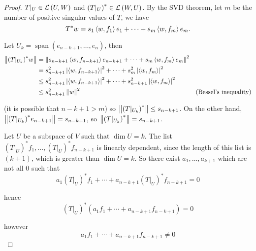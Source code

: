 \begin{proof}
    $T\vert_U\in \mathcal{L}\left({U, W}\right)$ and ${(T\vert_{U})}^{*}\in \mathcal{L}\left({W, U}\right)$. By the SVD theorem, let $m$ be the number of positive singular values of $T$, we have
    \[
        T^{*}w = s_{1}\left\langle{w, f_{1}}\right\rangle e_{1} + \cdots + s_{m}\left\langle{w, f_{m}}\right\rangle e_{m}.
    \]

    Let $U_{k} = \operatorname{span}(e_{n-k+1}, \ldots, e_{n})$, then
    \begin{align*}
        \left\Vert{{(T\vert_{U_{k}})}^{*}w}\right\Vert & = \left\Vert{s_{n-k+1}\left\langle{w, f_{n-k+1}}\right\rangle e_{n-k+1} + \cdots + s_{m}\left\langle{w, f_{m}}\right\rangle e_{m}}\right\Vert^{2}                                          \\
                                       & = s_{n-k+1}^{2}\left\vert{\left\langle{w, f_{n-k+1}}\right\rangle}\right\vert^{2} + \cdots + s_{m}^{2}\left\vert{\left\langle{w, f_{m}}\right\rangle}\right\vert^{2}                                       \\
                                       & \leq s_{n-k+1}^{2}\left\vert{\left\langle{w, f_{n-k+1}}\right\rangle}\right\vert^{2} + \cdots + s_{n-k+1}^{2}\left\vert{\left\langle{w, f_{m}}\right\rangle}\right\vert^{2}                                \\
                                       & \leq s_{n-k+1}^{2}\left\Vert{w}\right\Vert^{2}                                                                              & \text{(Bessel's inequality)}
    \end{align*}

    (it is possible that $n-k+1 > m$) so $\left\Vert{{(T\vert_{U_{k}})}^{*}}\right\Vert \leq s_{n-k+1}$. On the other hand, $\left\Vert{{(T\vert_{U_{k}})}^{*}e_{n-k+1}}\right\Vert = s_{n-k+1}$, so $\left\Vert{{(T\vert_{U_{k}})}^{*}}\right\Vert = s_{n-k+1}$.

    \bigskip
    Let $U$ be a subspace of $V$ such that $\dim U = k$. The list ${(T\vert_{U})}^{*}f_{1}, \ldots, {(T\vert_{U})}^{*}f_{n - k + 1}$ is linearly dependent, since the length of this list is $(k + 1)$, which is greater than $\dim U = k$. So there exist $a_{1}, \ldots, a_{k+1}$ which are not all $0$ such that
    \[
        a_{1}{(T\vert_{U})}^{*}f_{1} + \cdots + a_{n-k+1}{(T\vert_{U})}^{*}f_{n-k+1} = 0
    \]

    hence
    \[
        {(T\vert_{U})}^{*}(a_{1}f_{1} + \cdots + a_{n-k+1}f_{n-k+1}) = 0
    \]

    however
    \[
        a_{1}f_{1} + \cdots + a_{n-k+1}f_{n-k+1}\ne 0
    \]


\end{proof}

